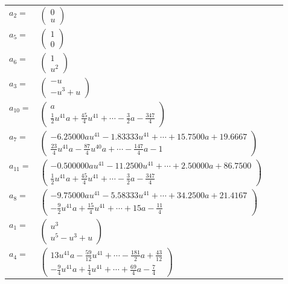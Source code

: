 \documentclass[1p]{elsarticle_modified}
\theoremstyle{definition}
\begin{document}
\begin{tabular}{m{7pt} m{180pt} m{7pt} m{180pt} }
\flushright $a_{2}=$&$\begin{pmatrix}0\\u\end{pmatrix}$ \\
\flushright $a_{5}=$&$\begin{pmatrix}1\\0\end{pmatrix}$ \\
\flushright $a_{6}=$&$\begin{pmatrix}1\\u^2\end{pmatrix}$ \\
\flushright $a_{3}=$&$\begin{pmatrix}- u\\- u^3+u\end{pmatrix}$ \\
\flushright $a_{10}=$&$\begin{pmatrix}a\\\frac{1}{2} u^{41} a+\frac{45}{4} u^{41}+\cdots-\frac{3}{2} a-\frac{347}{4}\end{pmatrix}$ \\
\flushright $a_{7}=$&$\begin{pmatrix}-6.25000 a u^{41}-1.83333 u^{41}+\cdots+15.7500 a+19.6667\\\frac{23}{4} u^{41} a-\frac{87}{4} u^{40} a+\cdots-\frac{147}{4} a-1\end{pmatrix}$ \\
\flushright $a_{11}=$&$\begin{pmatrix}-0.500000 a u^{41}-11.2500 u^{41}+\cdots+2.50000 a+86.7500\\\frac{1}{2} u^{41} a+\frac{45}{4} u^{41}+\cdots-\frac{3}{2} a-\frac{347}{4}\end{pmatrix}$ \\
\flushright $a_{8}=$&$\begin{pmatrix}-9.75000 a u^{41}-5.58333 u^{41}+\cdots+34.2500 a+21.4167\\-\frac{9}{2} u^{41} a+\frac{15}{4} u^{41}+\cdots+15 a-\frac{11}{4}\end{pmatrix}$ \\
\flushright $a_{1}=$&$\begin{pmatrix}u^3\\u^5- u^3+u\end{pmatrix}$ \\
\flushright $a_{4}=$&$\begin{pmatrix}13 u^{41} a-\frac{59}{12} u^{41}+\cdots-\frac{181}{2} a+\frac{43}{12}\\-\frac{9}{4} u^{41} a+\frac{1}{4} u^{41}+\cdots+\frac{69}{4} a-\frac{7}{4}\end{pmatrix}$ \\

\end{tabular}
\end{document}
